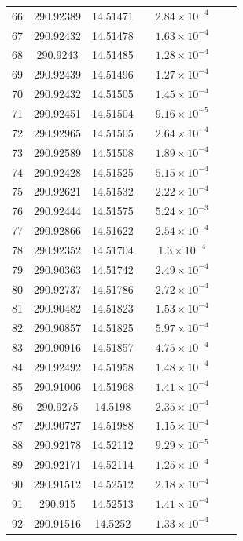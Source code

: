\begin{table}
\begin{tabular}{ccccccc}
66 & 290.92389 & 14.51471 &  & $2.84\times10^{-4}$ &  &  \\
67 & 290.92432 & 14.51478 &  & $1.63\times10^{-4}$ &  &  \\
68 & 290.9243 & 14.51485 &  & $1.28\times10^{-4}$ &  &  \\
69 & 290.92439 & 14.51496 &  & $1.27\times10^{-4}$ &  &  \\
70 & 290.92432 & 14.51505 &  & $1.45\times10^{-4}$ &  &  \\
71 & 290.92451 & 14.51504 &  & $9.16\times10^{-5}$ &  &  \\
72 & 290.92965 & 14.51505 &  & $2.64\times10^{-4}$ &  &  \\
73 & 290.92589 & 14.51508 &  & $1.89\times10^{-4}$ &  &  \\
74 & 290.92428 & 14.51525 &  & $5.15\times10^{-4}$ &  &  \\
75 & 290.92621 & 14.51532 &  & $2.22\times10^{-4}$ &  &  \\
76 & 290.92444 & 14.51575 &  & $5.24\times10^{-3}$ &  &  \\
77 & 290.92866 & 14.51622 &  & $2.54\times10^{-4}$ &  &  \\
78 & 290.92352 & 14.51704 &  & $1.3\times10^{-4}$ &  &  \\
79 & 290.90363 & 14.51742 &  & $2.49\times10^{-4}$ &  &  \\
80 & 290.92737 & 14.51786 &  & $2.72\times10^{-4}$ &  &  \\
81 & 290.90482 & 14.51823 &  & $1.53\times10^{-4}$ &  &  \\
82 & 290.90857 & 14.51825 &  & $5.97\times10^{-4}$ &  &  \\
83 & 290.90916 & 14.51857 &  & $4.75\times10^{-4}$ &  &  \\
84 & 290.92492 & 14.51958 &  & $1.48\times10^{-4}$ &  &  \\
85 & 290.91006 & 14.51968 &  & $1.41\times10^{-4}$ &  &  \\
86 & 290.9275 & 14.5198 &  & $2.35\times10^{-4}$ &  &  \\
87 & 290.90727 & 14.51988 &  & $1.15\times10^{-4}$ &  &  \\
88 & 290.92178 & 14.52112 &  & $9.29\times10^{-5}$ &  &  \\
89 & 290.92171 & 14.52114 &  & $1.25\times10^{-4}$ &  &  \\
90 & 290.91512 & 14.52512 &  & $2.18\times10^{-4}$ &  &  \\
91 & 290.915 & 14.52513 &  & $1.41\times10^{-4}$ &  &  \\
92 & 290.91516 & 14.5252 &  & $1.33\times10^{-4}$ &  &  \\
\end{tabular}
\end{table}
